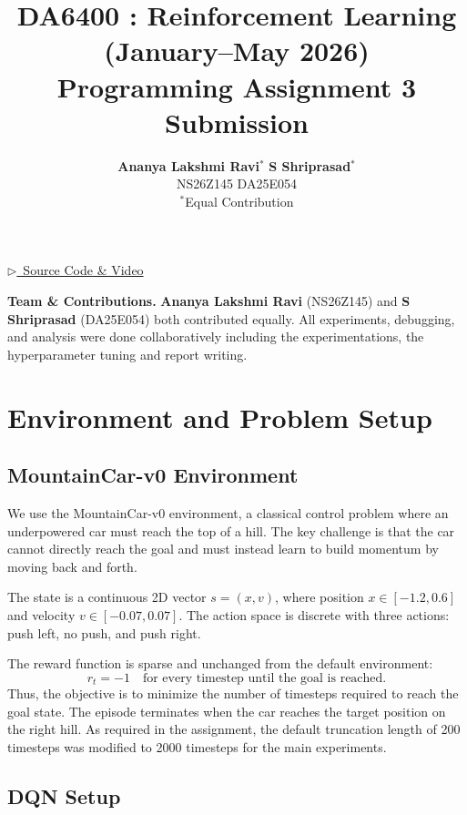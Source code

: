 \documentclass[11pt,a4paper]{article}
\title{\large\textbf{DA6400 : Reinforcement Learning (January--May 2026)\\
Programming Assignment 3 Submission}}
\author{
\textbf{Ananya Lakshmi Ravi}$^{*}$ \quad
\textbf{S Shriprasad}$^{*}$ \\[4pt]
\small NS26Z145 \qquad DA25E054 \\[2pt]
\small $^{*}$Equal Contribution
}
\date{}
\begin{document}
\maketitle
\vspace{-10pt}
\begin{center}
  \href{https://drive.google.com/drive/folders/1X8uYGpbVx5FsxH4-krvNpYKt9eCBpvZ9?usp=sharing}{{\color{blue}$\triangleright$~Source Code \& Video}}
\end{center}
\vspace{-4pt}

\noindent\textbf{Team \& Contributions.}
\textbf{Ananya Lakshmi Ravi} (NS26Z145) and \textbf{S Shriprasad} (DA25E054) both contributed equally. All experiments, debugging, and analysis were done collaboratively including the experimentations, the hyperparameter tuning and report writing.

\vspace{4pt}
\section*{Environment and Problem Setup}

\subsection{MountainCar-v0 Environment}

We use the MountainCar-v0 environment, a classical control problem where an underpowered car must reach the top of a hill. The key challenge is that the car cannot directly reach the goal and must instead learn to build momentum by moving back and forth.

The state is a continuous 2D vector \(s = (x, v)\), where position \(x \in [-1.2, 0.6]\) and velocity \(v \in [-0.07, 0.07]\). The action space is discrete with three actions: push left, no push, and push right.

The reward function is sparse and unchanged from the default environment:
\[
r_t = -1 \quad \text{for every timestep until the goal is reached.}
\]
Thus, the objective is to minimize the number of timesteps required to reach the goal state. The episode terminates when the car reaches the target position on the right hill. As required in the assignment, the default truncation length of 200 timesteps was modified to 2000 timesteps for the main experiments.

\subsection{DQN Setup}
\end{document}
